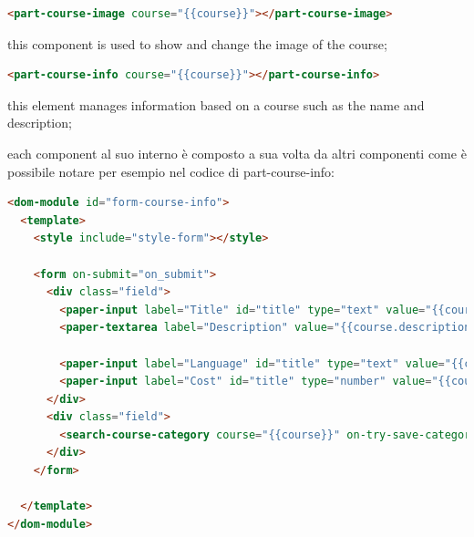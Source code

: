 \begin{lstlisting}[language=html]
<part-course-image course="{{course}}"></part-course-image>
\end{lstlisting}
this component is used to show and change the image of the course;

\begin{lstlisting}[language=html]
<part-course-info course="{{course}}"></part-course-info>
\end{lstlisting}
this element manages information based on a course such as the name and description;


each component al suo interno è composto a sua volta da altri componenti come è possibile notare per esempio nel codice di part-course-info:

\begin{lstlisting}[language=html]
<dom-module id="form-course-info">
  <template>
    <style include="style-form"></style>

    <form on-submit="on_submit">
      <div class="field">
        <paper-input label="Title" id="title" type="text" value="{{course.title}}"></paper-input>
        <paper-textarea label="Description" value="{{course.description}}"></paper-textarea>
      
        <paper-input label="Language" id="title" type="text" value="{{course.language}}"></paper-input>
        <paper-input label="Cost" id="title" type="number" value="{{course.cost}}"></paper-input>
      </div>
      <div class="field">
        <search-course-category course="{{course}}" on-try-save-categories="on_try_save_categories" on-try-delete-category="on_try_delete_category"></search-course-category>
      </div>
    </form>

  </template>
</dom-module>
\end{lstlisting}





